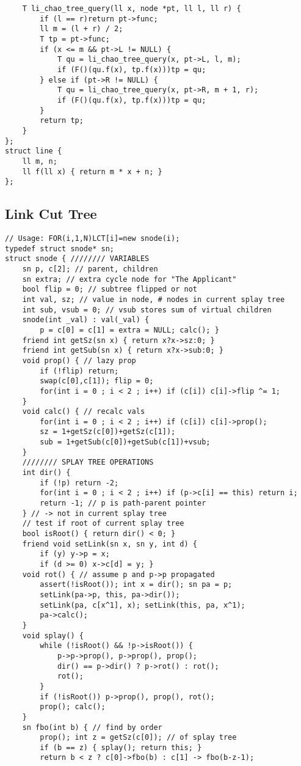 \documentclass[landscape, 8pt, a4paper, oneside]{extarticle}
\begin{document}
\begin{multicols}{3}
\begin{verbatim}
    T li_chao_tree_query(ll x, node *pt, ll l, ll r) {
        if (l == r)return pt->func;
        ll m = (l + r) / 2;
        T tp = pt->func;
        if (x <= m && pt->L != NULL) {
            T qu = li_chao_tree_query(x, pt->L, l, m);
            if (F()(qu.f(x), tp.f(x)))tp = qu;
        } else if (pt->R != NULL) {
            T qu = li_chao_tree_query(x, pt->R, m + 1, r);
            if (F()(qu.f(x), tp.f(x)))tp = qu;
        }
        return tp;
    }
};
struct line {
    ll m, n;
    ll f(ll x) { return m * x + n; }
};
\end{verbatim}
\subsection{Link Cut Tree}
\begin{verbatim}
// Usage: FOR(i,1,N)LCT[i]=new snode(i);
typedef struct snode* sn;
struct snode { //////// VARIABLES
	sn p, c[2]; // parent, children
	sn extra; // extra cycle node for "The Applicant"
	bool flip = 0; // subtree flipped or not
	int val, sz; // value in node, # nodes in current splay tree
	int sub, vsub = 0; // vsub stores sum of virtual children
	snode(int _val) : val(_val) {
		p = c[0] = c[1] = extra = NULL; calc(); }
	friend int getSz(sn x) { return x?x->sz:0; }
	friend int getSub(sn x) { return x?x->sub:0; }
	void prop() { // lazy prop
		if (!flip) return;
		swap(c[0],c[1]); flip = 0;
		for(int i = 0 ; i < 2 ; i++) if (c[i]) c[i]->flip ^= 1;
	}
	void calc() { // recalc vals
		for(int i = 0 ; i < 2 ; i++) if (c[i]) c[i]->prop();
		sz = 1+getSz(c[0])+getSz(c[1]);
		sub = 1+getSub(c[0])+getSub(c[1])+vsub;
	}
	//////// SPLAY TREE OPERATIONS
	int dir() {
		if (!p) return -2;
		for(int i = 0 ; i < 2 ; i++) if (p->c[i] == this) return i;
		return -1; // p is path-parent pointer
	} // -> not in current splay tree
	// test if root of current splay tree
	bool isRoot() { return dir() < 0; } 
	friend void setLink(sn x, sn y, int d) {
		if (y) y->p = x;
		if (d >= 0) x->c[d] = y; }
	void rot() { // assume p and p->p propagated
		assert(!isRoot()); int x = dir(); sn pa = p;
		setLink(pa->p, this, pa->dir());
		setLink(pa, c[x^1], x); setLink(this, pa, x^1);
		pa->calc();
	}
	void splay() {
		while (!isRoot() && !p->isRoot()) {
			p->p->prop(), p->prop(), prop();
			dir() == p->dir() ? p->rot() : rot();
			rot();
		}
		if (!isRoot()) p->prop(), prop(), rot();
		prop(); calc();
	}
	sn fbo(int b) { // find by order
		prop(); int z = getSz(c[0]); // of splay tree
		if (b == z) { splay(); return this; }
		return b < z ? c[0]->fbo(b) : c[1] -> fbo(b-z-1);

\end{verbatim}
\end{multicols}
\end{document}
